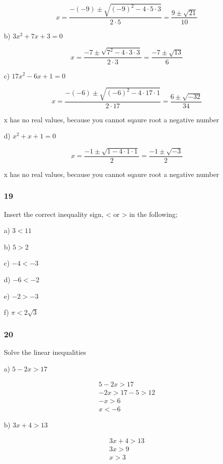 \documentclass[]{report}
\begin{document}
\[
x = \frac{-(-9) \pm \sqrt{(-9)^2 - 4\cdot5\cdot3}}{2\cdot5} = \frac{9 \pm \sqrt{21}}{10}
\]

b) $3x^2 + 7x + 3 = 0$

\[
x = \frac{-7 \pm \sqrt{7^2 - 4\cdot3\cdot3}}{2\cdot3} = \frac{-7 \pm \sqrt{13}}{6}
\]

c) $17x^2 - 6x + 1 = 0$

\[
x = \frac{-(-6) \pm \sqrt{(-6)^2 - 4\cdot17\cdot1}}{2\cdot17} = \frac{6 \pm \sqrt{-32}}{34}
\]

x has no real values, because you cannot sqaure root a negative number


d) $x^2 + x + 1 = 0$

\[
x = \frac{-1 \pm \sqrt{1 - 4\cdot1\cdot1}}{2} = \frac{-1 \pm \sqrt{-3}}{2}
\]

x has no real values, because you cannot sqaure root a negative number

\subsubsection{19}

Insert the correct inequality sign, < or > in the following;

a) $ 3 < 11$

b) $5 > 2$

c) $-4 < -3 $

d) $-6 < -2$

e) $-2 > -3$

f) $\pi < 2\sqrt{3}$

\subsubsection{20}

Solve the linear inequalities

a) $ 5-2x > 17 $

\begin{align*}
5-2x > 17  \\
-2x > 17 - 5 > 12 \tag*{taking 5 off}\\
-x > 6 \tag*{dividing by 2}\\
x < -6 \tag*{multiplying by -1}
\end{align*}

b) $ 3x + 4 > 13$

\begin{align*}
3x + 4 > 13 \\
3x > 9 \tag*{taking 4 off}\\
x > 3 \tag*{dividing by 3}
\end{align*}
\end{document}
